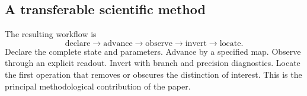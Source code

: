 \subsection{A transferable scientific method}

The resulting workflow is
\begin{equation}
\boxed{
\text{declare}
\longrightarrow
\text{advance}
\longrightarrow
\text{observe}
\longrightarrow
\text{invert}
\longrightarrow
\text{locate}.
}
\label{eq:workflow}
\end{equation}
Declare the complete state and parameters. Advance by a specified map. Observe through an explicit readout. Invert with branch and precision diagnostics. Locate the first operation that removes or obscures the distinction of interest. This is the principal methodological contribution of the paper.
